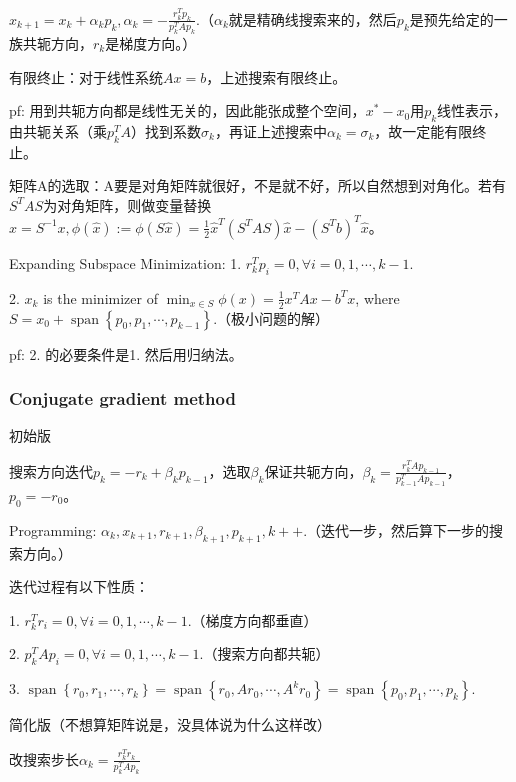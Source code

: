 $x_{k+1}=x_{k}+\alpha_{k} p_{k}, \alpha_{k}=-\frac{r_{k}^{T} p_{k}}{p_{k}^T A p_{k}}
$.（$\alpha_k$就是精确线搜索来的，然后$p_k$是预先给定的一族共轭方向，$r_k$是梯度方向。）

有限终止：对于线性系统$Ax = b$，上述搜索有限终止。

pf: 用到共轭方向都是线性无关的，因此能张成整个空间，$x^{\ast} - x_0$用$p_k$线性表示，由共轭关系（乘$p_k^T A$）找到系数$\sigma_k$，再证上述搜索中$\alpha_k = \sigma_k$，故一定能有限终止。

矩阵A的选取：A要是对角矩阵就很好，不是就不好，所以自然想到对角化。若有$S^T A S$为对角矩阵，则做变量替换$\hat{x} = S^{-1}x, \hat{\phi}(\hat{x}):=\phi(S \hat{x})=\frac{1}{2} \hat{x}^{T}\left(S^{T} A S\right) \hat{x}-\left(S^{T} b\right)^{T} \hat{x}$。

Expanding Subspace Minimization: 1. $r_{k}^{T} p_{i}=0, \forall i=0, 1, \cdots, k-1$.

2. $x_{k}$ is the minimizer of $\min_{x \in S}\phi(x)=\frac{1}{2} x^{T} A x-b^{T} x$, where $S = x_{0}+\operatorname{span}\left\{p_{0}, p_{1}, \cdots, p_{k-1}\right\} .$（极小问题的解）

pf: 2. 的必要条件是1. 然后用归纳法。

\subsubsection{Conjugate gradient method}

初始版

搜索方向迭代$p_{k}=-r_{k}+\beta_{k} p_{k-1}$，选取$\beta_k$保证共轭方向，$\beta_{k}=\frac{r_{k}^{T} A p_{k-1}}{p_{k-1}^{T} A p_{k-1}}$，$p_0 = -r_0$。

Programming: $\alpha_k, x_{k + 1}, r_{k + 1}, \beta_{k + 1}, p_{k + 1}, k++$.（迭代一步，然后算下一步的搜索方向。）

迭代过程有以下性质：

1. $r_{k}^{T} r_{i} = 0, \forall i=0, 1, \cdots, k-1.$（梯度方向都垂直）

2. $p_{k}^{T} A p_{i} = 0, \forall i=0,1, \cdots, k-1 .$（搜索方向都共轭）

3. $\operatorname{span}\left\{r_{0}, r_{1}, \cdots, r_{k}\right\} = \operatorname{span}\left\{r_{0}, A r_{0}, \cdots, A^{k} r_{0}\right\} = \operatorname{span}\left\{p_{0}, p_{1}, \cdots, p_{k}\right\} .$

简化版（不想算矩阵说是，没具体说为什么这样改）

改搜索步长$\alpha_{k}=\frac{r_{k}^{T} r_{k}}{p_{k}^{T} A p_{k}}$

